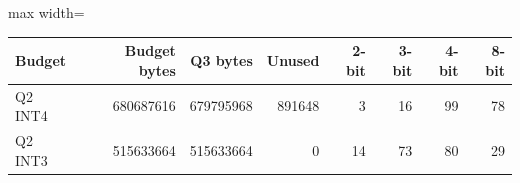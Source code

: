 \scriptsize
\setlength{\tabcolsep}{3.5pt}
\label{tab:t1q3budget}
\begin{adjustbox}{max width=\linewidth}
\begin{tabular}{lrrrrrrr}
\toprule
Budget & Budget bytes & Q3 bytes & Unused & 2-bit & 3-bit & 4-bit & 8-bit \\
\midrule
Q2 INT4 & 680687616 & 679795968 & 891648 & 3 & 16 & 99 & 78 \\
Q2 INT3 & 515633664 & 515633664 & 0 & 14 & 73 & 80 & 29 \\
\bottomrule
\end{tabular}
\end{adjustbox}
